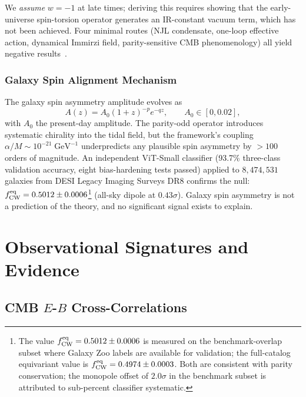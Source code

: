 \documentclass[aps,prd,twocolumn,superscriptaddress,showpacs,preprintnumbers,nofootinbib,longbibliography,floatfix]{revtex4-2}
\newcommand{\fcw}{f_{\rm CW}}
\begin{document}
We \textit{assume} $w = -1$ at late times; deriving this requires showing that the early-universe spin-torsion operator generates an IR-constant vacuum term, which has not been achieved. Four minimal routes (NJL condensate, one-loop effective action, dynamical Immirzi field, parity-sensitive CMB phenomenology) all yield negative results~\cite{Golden2026supplement}.

\subsubsection{Galaxy Spin Alignment Mechanism}\label{sec:spinmech}

The galaxy spin asymmetry amplitude evolves as
\begin{equation}
A(z) = A_0(1+z)^{-p}e^{-qz}, \qquad A_0 \in [0,0.02],
\label{eq:Az}
\end{equation}
with $A_0$ the present-day amplitude. The parity-odd operator introduces systematic chirality into the tidal field, but the framework's coupling $\alpha/M \sim 10^{-21}\;\text{GeV}^{-1}$ underpredicts any plausible spin asymmetry by $>100$ orders of magnitude. An independent ViT-Small classifier (93.7\% three-class validation accuracy, eight bias-hardening tests passed) applied to $8{,}474{,}531$ galaxies from DESI Legacy Imaging Surveys DR8 confirms the null: $\fcw^{\rm eq} = 0.5012 \pm 0.0006$\footnote{\label{fn:fcw}The value $\fcw^{\rm eq} = 0.5012 \pm 0.0006$ is measured on the benchmark-overlap subset where Galaxy Zoo labels are available for validation; the full-catalog equivariant value is $\fcw^{\rm eq} = 0.4974 \pm 0.0003$. Both are consistent with parity conservation; the monopole offset of $2.0\sigma$ in the benchmark subset is attributed to sub-percent classifier systematic.} (all-sky dipole at $0.43\sigma$). Galaxy spin asymmetry is not a prediction of the theory, and no significant signal exists to explain.


\section{Observational Signatures and Evidence}\label{sec:obs}

\subsection{CMB $E$-$B$ Cross-Correlations}\label{sec:EB}
\end{document}
